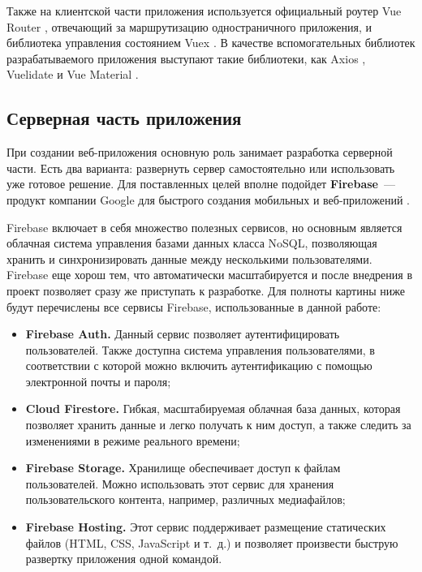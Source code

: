 Также на клиентской части приложения используется официальный роутер Vue Router \cite{vuerouter}, отвечающий за маршрутизацию одностраничного приложения, и библиотека управления состоянием Vuex \cite{vuex}. В качестве вспомогательных библиотек разрабатываемого приложения выступают такие библиотеки, как Axios \cite{axios}, Vuelidate \cite{vuelidate} и Vue Material \cite{vuematerial}.

\subsection{Серверная часть приложения}

При создании веб-приложения основную роль занимает разработка серверной части. Есть два варианта: развернуть сервер самостоятельно или использовать уже готовое решение. Для поставленных целей вполне подойдет \textbf{Firebase}~--- продукт компании Google для быстрого создания мобильных и веб-приложений \cite{firebase}.

Firebase включает в себя множество полезных сервисов, но основным является облачная система управления базами данных класса NoSQL, позволяющая хранить и синхронизировать данные между несколькими пользователями. Firebase еще хорош тем, что автоматически масштабируется и после внедрения в проект позволяет сразу же приступать к разработке. Для полноты картины ниже будут перечислены все сервисы Firebase, использованные в данной работе:

\begin{itemize}
	\item \textbf{Firebase Auth.} Данный сервис позволяет аутентифицировать пользователей. Также доступна система управления пользователями, в соответствии с которой можно включить аутентификацию с помощью электронной почты и пароля;
	\item \textbf{Cloud Firestore.} Гибкая, масштабируемая облачная база данных, которая позволяет хранить данные и легко получать к ним доступ, а также следить за изменениями в режиме реального времени;
	\item \textbf{Firebase Storage.} Хранилище обеспечивает доступ к файлам пользователей. Можно использовать этот сервис для хранения пользовательского контента, например, различных медиафайлов;
	\item \textbf{Firebase Hosting.} Этот сервис поддерживает размещение статических файлов (HTML, CSS, JavaScript и т.~д.) и позволяет произвести быструю развертку приложения одной командой.
\end{itemize}

